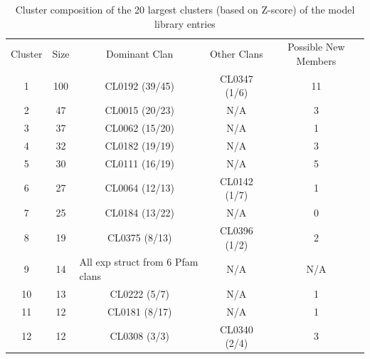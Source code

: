 \begin{table}[]
\caption{Cluster composition of the 20 largest clusters (based on Z-score) of the model library entries}
\begin{tabular}{ccccc}
\rowcolor[HTML]{BFBFBF} 
Cluster & Size & Dominant Clan                                                                & Other Clans  & Possible New Members \\
\rowcolor[HTML]{E9EBF5} 
1       & 100  & CL0192 (39/45)                                                               & CL0347 (1/6) & 11                   \\
2       & 47   & CL0015 (20/23)                                                               & N/A          & 3                    \\
\rowcolor[HTML]{E9EBF5} 
3       & 37   & CL0062 (15/20)                                                               & N/A          & 1                    \\
4       & 32   & CL0182 (19/19)                                                               & N/A          & 3                    \\
\rowcolor[HTML]{E9EBF5} 
5       & 30   & CL0111 (16/19)                                                               & N/A          & 5                    \\
6       & 27   & CL0064 (12/13)                                                               & CL0142 (1/7) & 1                    \\
\rowcolor[HTML]{E9EBF5} 
7       & 25   & CL0184 (13/22)                                                               & N/A          & 0                    \\
8       & 19   & CL0375 (8/13)                                                                & CL0396 (1/2) & 2                    \\
\rowcolor[HTML]{E9EBF5} 
9       & 14   & \multicolumn{1}{l}{\cellcolor[HTML]{E9EBF5}All exp struct from 6 Pfam clans} & N/A          & N/A                  \\
10      & 13   & CL0222 (5/7)                                                                 & N/A          & 1                    \\
\rowcolor[HTML]{E9EBF5} 
11      & 12   & CL0181 (8/17)                                                                & N/A          & 1                    \\
12      & 12   & CL0308 (3/3)                                                                 & CL0340 (2/4) & 3                    \\

\end{tabular}
\end{table}
